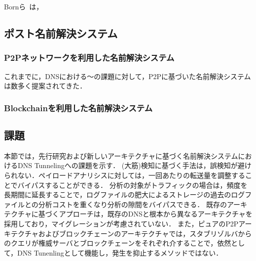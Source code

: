 Bornら~\cite{born}は，

\subsection{ポスト名前解決システム}
\subsubsection{P2Pネットワークを利用した名前解決システム}
これまでに，DNSにおける〜の課題に対して，P2Pに基づいた名前解決システムは数多く提案されてきた．
\subsubsection{Blockchainを利用した名前解決システム}
\subsection{課題}
\label{sec:issue-past-works}
本節では，先行研究および新しいアーキテクチャに基づく名前解決システムにおけるDNS Tunnelingへの課題を示す．
(大筋)検知に基づく手法は，誤検知が避けられない．ペイロードアナリシスに対しては，一回あたりの転送量を調整することでバイパスすることができる．
分析の対象がトラフィックの場合は，頻度を長期間に延長することで，ログファイルの肥大によるストレージの過去のログファイルとの分析コストを重くなり分析の隙間をバイパスできる．
既存のアーキテクチャに基づくアプローチは，既存のDNSと根本から異なるアーキテクチャを採用しており，マイグレーションが考慮されていない．
また，ピュアのP2Pアーキテクチャおよびブロックチェーンのアーキテクチャでは，スタブリゾルバからのクエリが権威サーバとブロックチェーンをそれぞれ介することで，依然として，DNS Tunenlingとして機能し，発生を抑止するメソッドではない．
